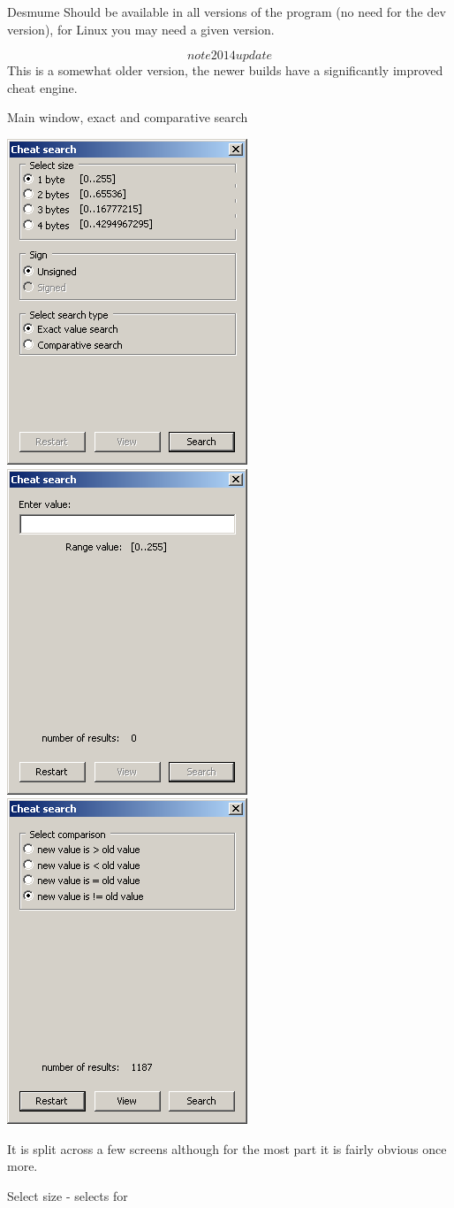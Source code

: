 \documentclass[
]{book}
\begin{document}
Desmume Should be available in all versions of the program (no need for the dev version), for Linux you may need a given version.

\[note 2014 update\] This is a somewhat older version, the newer builds have a significantly improved cheat engine.

Main window, exact and comparative search

\includegraphics{images/196_home_fast6191_romhackingguide_unrenamed_fil___ginal_borders_romhackingguideDSdesmumecheat.png}\includegraphics{images/197_home_fast6191_romhackingguide_unrenamed_fil___inal_borders_romhackingguidedsdesmumecheat3.png}\includegraphics{images/198_home_fast6191_romhackingguide_unrenamed_fil___nal_borders_romhackingguidedsdesmumecheats2.png}

It is split across a few screens although for the most part it is fairly obvious once more.

Select size - selects for 
\end{document}
